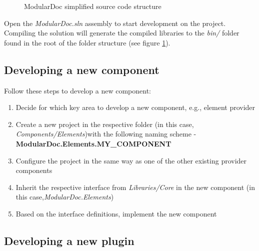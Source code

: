 \begin{figure}[H]
    \caption{ModularDoc simplified source code structure}
    \label{fig:sourceCodeFileStructure}
\end{figure}

Open the \textit{ModularDoc.sln} assembly to start development on the project.
Compiling the solution will generate the compiled libraries to the \textit{bin/} folder found in the root of the folder structure (see figure \ref{fig:sourceCodeFileStructure}).

\subsection{Developing a new component}

Follow these steps to develop a new component:
\begin{enumerate}
    \item Decide for which key area to develop a new component, e.g., element provider
    \item Create a new project in the respective folder (in this case, \textit{Components/Elements})\linebreak with the following naming scheme - \textbf{ModularDoc.Elements.MY\_COMPONENT}
    \item Configure the project in the same way as one of the other existing provider components
    \item Inherit the respective interface from \textit{Libraries/Core} in the new component (in this case,\linebreak \textit{ModularDoc.Elements})
    \item Based on the interface definitions, implement the new component
\end{enumerate}

\pagebreak
\subsection{Developing a new plugin}

